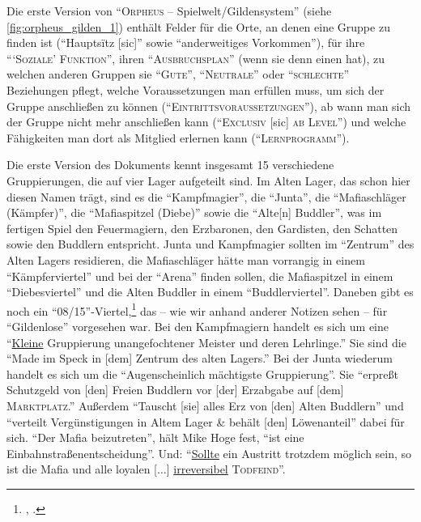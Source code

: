 \documentclass[a5paper,pagesize,numbers=noenddot]{scrbook}
\begin{document}
Die erste Version von \enquote{\textsc{Orpheus} -- Spielwelt/Gildensystem} (siehe \autoref{fig:orpheus_gilden_1}) enthält Felder für die Orte, an denen eine Gruppe zu finden ist (\enquote{Hauptsïtz [sic]} sowie \enquote{anderweitiges Vorkommen}), für ihre \enquote{\enquote{\textsc{Soziale}} \textsc{Funktion}}, ihren \enquote{\textsc{Ausbruchsplan}} (wenn sie denn einen hat), zu welchen anderen Gruppen sie \enquote{\textsc{Gute}}, \enquote{\textsc{Neutrale}} oder \enquote{\textsc{schlechte}} Beziehungen pflegt, welche Voraussetzungen man erfüllen muss, um sich der Gruppe anschließen zu können (\enquote{\textsc{Eintrittsvoraussetzungen}}), ab wann man sich der Gruppe nicht mehr anschließen kann (\enquote{\textsc{Exclusiv} [sic] \textsc{ab Level}}) und welche Fähigkeiten man dort als Mitglied erlernen kann (\enquote{\textsc{Lernprogramm}}).

Die erste Version des Dokuments kennt insgesamt 15 verschiedene Gruppierungen, die auf vier Lager aufgeteilt sind.
Im Alten Lager, das schon hier diesen Namen trägt, sind es die \enquote{Kampfmagier},\autocite[S.~2]{orpheus_gildensystem} die \enquote{Junta},\autocite[S.~1]{orpheus_gildensystem} die \enquote{Mafiaschläger (Kämpfer)},\autocite[S.~4]{orpheus_gildensystem} die \enquote{Mafiaspitzel (Diebe)}\autocite[S.~5]{orpheus_gildensystem} sowie die \enquote{Alte[n] Buddler},\autocite[S.~3]{orpheus_gildensystem} was im fertigen Spiel den Feuermagiern, den Erzbaronen, den Gardisten, den Schatten sowie den Buddlern entspricht.
Junta und Kampfmagier sollten im \enquote{Zentrum} des Alten Lagers residieren, die Mafiaschläger hätte man vorrangig in einem \enquote{Kämpferviertel} und bei der \enquote{Arena} finden sollen, die Mafiaspitzel in einem \enquote{Diebesviertel} und die Alten Buddler in einem \enquote{Buddlerviertel}.
Daneben gibt es noch ein \enquote{08/15}-Viertel,\footnote{\autocite[S.~4]{orpheus_gildensystem}, \autocite[S.~12, 14\,f.]{orpheus_b_scribbles}.} das -- wie wir anhand anderer Notizen sehen -- für \enquote{Gildenlose}\autocite[S.~15]{orpheus_b_scribbles} vorgesehen war.
Bei den Kampfmagiern handelt es sich um eine \enquote{\uline{Kleine} Gruppierung unangefochtener Meister und deren Lehrlinge.}
Sie sind die \enquote{Made im Speck in [dem] Zentrum des alten Lagers.}\autocite[S.~2]{orpheus_gildensystem}
Bei der Junta wiederum handelt es sich um die \enquote{Augenscheinlich mächtigste Gruppierung}.
Sie \enquote{erpreßt Schutzgeld von [den] Freien Buddlern vor [der] Erzabgabe auf [dem] \textsc{Marktplatz}.}
Außerdem \enquote{Tauscht [sie] alles Erz von [den] Alten Buddlern} und \enquote{verteilt Vergünstigungen in Altem Lager \& behält [den] Löwenanteil} dabei für sich.
\enquote{Der Mafia beizutreten}, hält Mike Hoge fest, \enquote{ist eine Einbahnstraßenentscheidung}.
Und:
\enquote{\uline{Sollte} ein Austritt trotzdem möglich sein, so ist die Mafia und alle loyalen [$\ldots$] \uline{irreversibel} \textsc{Todfeind}}.\autocite[S.~1]{orpheus_gildensystem}
\end{document}
